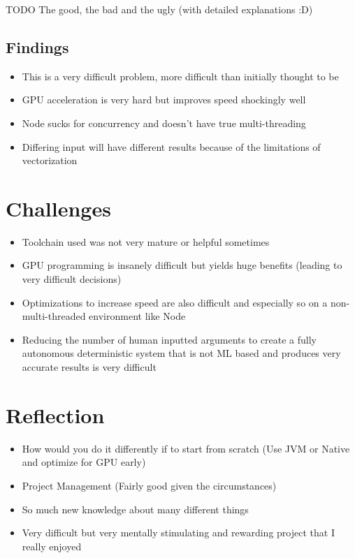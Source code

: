 \documentclass[12pt]{article}
\begin{document}
    TODO
    \linebreak
    The good, the bad and the ugly (with detailed explanations :D)

    \subsection{Findings}

    \begin{itemize}
        \item This is a very difficult problem, more difficult than initially thought to be
        \item GPU acceleration is very hard but improves speed shockingly well
        \item Node sucks for concurrency and doesn't have true multi-threading
        \item Differing input will have different results because of the limitations of vectorization
    \end{itemize}

    \pagebreak


    \section{Challenges}

    \begin{itemize}
        \item Toolchain used was not very mature or helpful sometimes
        \item GPU programming is insanely difficult but yields huge benefits (leading to very difficult decisions)
        \item Optimizations to increase speed are also difficult and especially so on a non-multi-threaded environment like Node
        \item Reducing the number of human inputted arguments to create a fully autonomous deterministic system that is not ML based and produces very accurate results is very difficult
    \end{itemize}

    \pagebreak


    \section{Reflection}

    \begin{itemize}
        \item How would you do it differently if to start from scratch (Use JVM or Native and optimize for GPU early)
        \item Project Management (Fairly good given the circumstances)
        \item So much new knowledge about many different things
        \item Very difficult but very mentally stimulating and rewarding project that I really enjoyed
    \end{itemize}
\end{document}

